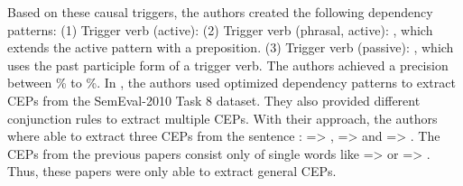 Based on these causal triggers, the authors created the following dependency patterns:
(1) Trigger verb (active): 
(2) Trigger verb (phrasal, active): , which extends the active pattern with a preposition.
(3) Trigger verb (passive): , which uses the past participle form of a trigger verb.
The authors achieved a precision between \% to \%.
In \cite{sorgente2013automatic}, the authors used optimized dependency patterns to extract \ac{CEP}s from the SemEval-2010 Task 8 dataset.
They also provided different conjunction rules to extract multiple \ac{CEP}s.
With their approach, the authors where able to extract three \ac{CEP}s from the sentence :  => ,  =>  and  => .
The \ac{CEP}s from the previous papers \cite{doan2019extracting, sorgente2013automatic} consist only of single words like  =>  or  => .
Thus, these papers were only able to extract general \ac{CEP}s.


